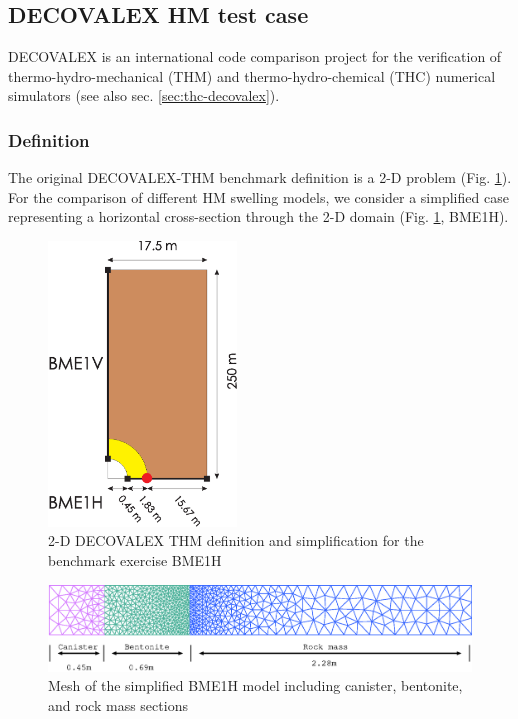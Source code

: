\subsection{DECOVALEX HM test case}
\label{sec:thm}

DECOVALEX is an international code comparison project for the verification of thermo-hydro-mechanical (THM) and thermo-hydro-chemical (THC) numerical simulators \cite{BirEtAl:2008} (see also sec. \ref{sec:thc-decovalex}).

\subsubsection*{Definition}

The original DECOVALEX-THM benchmark definition is a 2-D problem \cite{BirEtAl:2008} (Fig. \ref{fig:thm-1D}).
For the comparison of different HM swelling models, we consider a simplified case representing a horizontal cross-section through the 2-D domain (Fig. \ref{fig:thm-1D}, BME1H).

\begin{figure}[!htb]
\includegraphics[width=5cm]{HM/HM_unsat/D-BME.eps}
\caption{2-D DECOVALEX THM definition and simplification for the benchmark exercise BME1H}
\label{fig:thm-1D}
\end{figure}

\begin{figure}[!htb]
\includegraphics[scale=0.6]{HM/HM_unsat/hm_swelling.eps}
\caption{Mesh of the simplified BME1H model including canister, bentonite, and rock mass sections}
\label{fig:thm-1Dmesh}
\end{figure}

